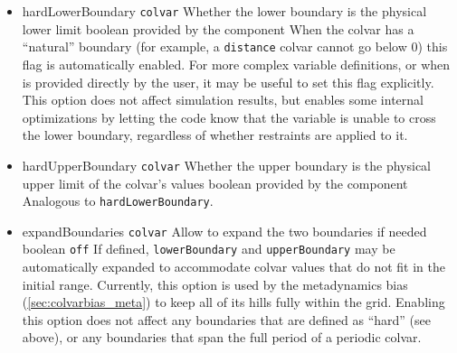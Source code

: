 \begin{itemize}
\item %
  \keydef
    {hardLowerBoundary}{%
    \texttt{colvar}}{%
    Whether the lower boundary is the physical lower limit}{%
    boolean}{%
    provided by the component}{%
    When the colvar has a ``natural'' boundary (for example, a \texttt{distance} colvar cannot go below 0) this flag is automatically enabled.
    For more complex variable definitions, or when  is provided directly by the user, it may be useful to set this flag explicitly.
    This option does not affect simulation results, but enables some internal optimizations by letting the code know that the variable is unable to cross the lower boundary, regardless of whether restraints are applied to it.}

\item %
  \keydef
    {hardUpperBoundary}{%
    \texttt{colvar}}{%
    Whether the upper boundary is the physical upper limit of the colvar's values}{%
    boolean}{%
    provided by the component}{%
    Analogous to \texttt{hardLowerBoundary}.}

\item %
  \keydef
    {expandBoundaries}{%
    \texttt{colvar}}{%
    Allow to expand the two boundaries if needed}{%
    boolean}{%
    \texttt{off}}{%
    If defined, \texttt{lowerBoundary} and \texttt{upperBoundary} may be automatically expanded to accommodate colvar values that do not fit in the initial range.
    Currently, this option is used by the metadynamics bias (\ref{sec:colvarbias_meta}) to keep all of its hills fully within the grid.
    Enabling this option does not affect any boundaries that are defined as ``hard'' (see above), or any boundaries that span the full period of a periodic colvar.}

\end{itemize}



